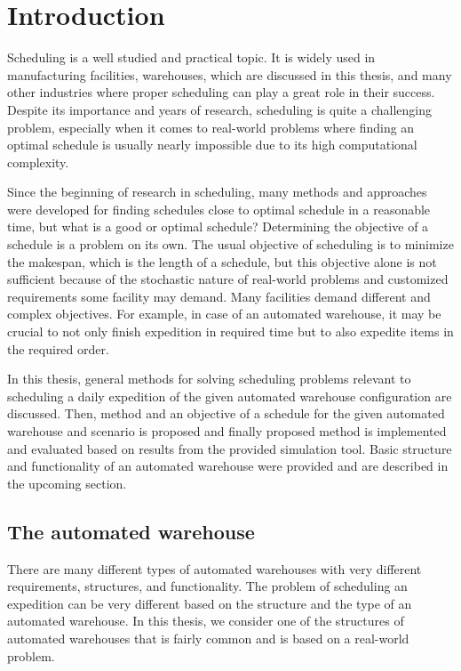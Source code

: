 \documentclass{ctuthesis}
\begin{document}
\maketitle

\chapter{Introduction}

Scheduling is a well studied and practical topic. It is widely used in manufacturing facilities, warehouses, which are discussed in this thesis, and many other industries where proper scheduling can play a great role in their success. Despite its importance and years of research, scheduling is quite a challenging problem, especially when it comes to real-world problems where finding an optimal schedule is usually nearly impossible due to its high computational complexity. 

Since the beginning of research in scheduling, many methods and approaches were developed for finding schedules close to optimal schedule in a reasonable time, but what is a good or optimal schedule? Determining the objective of a schedule is a problem on its own. The usual objective of scheduling is to minimize the makespan, which is the length of a schedule, but this objective alone is not sufficient because of the stochastic nature of real-world problems and customized requirements some facility may demand. Many facilities demand different and complex objectives. For example, in case of an automated warehouse, it may be crucial to not only finish expedition in required time but to also expedite items in the required order. 

In this thesis, general methods for solving scheduling problems relevant to scheduling a daily expedition of the given automated warehouse configuration are discussed. Then, method and an objective of a schedule for the given automated warehouse and scenario is proposed and finally proposed method is implemented and evaluated based on results from the provided simulation tool. Basic structure and functionality of an automated warehouse were provided and are described in the upcoming section.

\section{The automated warehouse}

There are many different types of automated warehouses with very different requirements, structures, and functionality. The problem of scheduling an expedition can be very different based on the structure and the type of an automated warehouse. In this thesis, we consider one of the structures of automated warehouses that is fairly common and is based on a real-world problem. 
\end{document}
